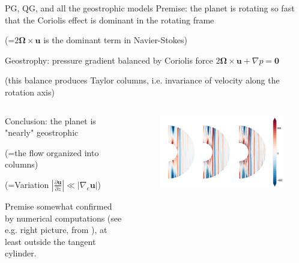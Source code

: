 \documentclass[11pt,aspectratio=169]{beamer}
\begin{document}
\begin{frame}{PG, QG, and all the geostrophic models}
    Premise: the planet is rotating so fast that the Coriolis effect is dominant in the rotating frame

	\hspace{3em} (=$2\bm{\Omega}\times \mathbf{u}$ is the dominant term in Navier-Stokes)
	\vspace{.5em}

	Geostrophy: pressure gradient balanced by Coriolis force $2\bm{\Omega}\times \mathbf{u} + \nabla p = \mathbf{0}$

	\hspace{3em} (this balance produces Taylor columns, i.e. invariance of velocity along the rotation axis)
	\vspace{.5em}
	\begin{columns}[t]
	\begin{column}{.52\linewidth}
		Conclusion: the planet is \textcolor{ETHRed}{"nearly" geostrophic}

		\hspace{3em} (=the flow organized into columns)
	
		\hspace{3em} (=Variation $|\frac{\partial \mathbf{u}}{\partial z}|\ll |\nabla_e \mathbf{u}|$)
		\vspace{1em}

		Premise somewhat confirmed by numerical computations (see e.g. right picture, from \textcite{jault_809_2015}), at least outside the tangent cylinder.
	\end{column}
	\begin{column}{.4\linewidth}
		\begin{figure}
			\centering
			\includegraphics[width=\linewidth]{elements/qg_ground.png}
		\end{figure}
	\end{column}
	\end{columns}
\end{frame}
\end{document}
